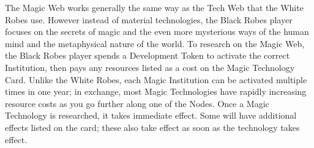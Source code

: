 The Magic Web works generally the same way as the Tech Web that the White Robes use. However instead of material technologies, the Black Robes player focuses on the secrets of magic and the even more mysterious ways of the human mind and the metaphysical nature of the world. To research on the Magic Web, the Black Robes player spends a Development Token to activate the correct Institution, then pays any resources listed as a cost on the Magic Technology Card. Unlike the White Robes, each Magic Institution can be activated multiple times in one year; in exchange, most Magic Technologies have rapidly increasing resource costs as you go further along one of the Nodes. Once a Magic Technology is researched, it takes immediate effect. Some will have additional effects listed on the card; these also take effect as soon as the technology takes effect.
